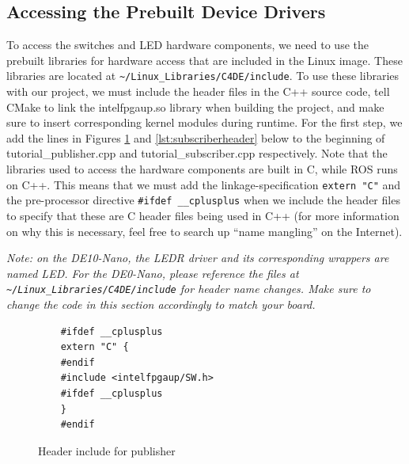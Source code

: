 \documentclass[11pt, twoside, pdftex]{article}
\begin{document}
\subsection{Accessing the Prebuilt Device Drivers}
To access the switches and LED hardware components, we need to use the prebuilt libraries for hardware access that are included in the Linux image. These libraries are located at \lstinline|~/Linux_Libraries/C4DE/include|. To use these libraries with our project, we must include the header files in the C++ source code, tell CMake to link the intelfpgaup.so library when building the project, and make sure to insert corresponding kernel modules during runtime. For the first step, we add the lines in Figures \ref{lst:publisherheader} and \ref{lst:subscriberheader} below to the beginning of tutorial\_publisher.cpp and tutorial\_subscriber.cpp respectively. Note that the libraries used to access the hardware components are built in C, while ROS runs on C++. This means that we must add the linkage-specification \lstinline|extern "C"| and the pre-processor directive \lstinline|#ifdef __cplusplus| when we include the header files to specify that these are C header files being used in C++ (for more information on why this is necessary, feel free to search up “name mangling” on the Internet). 

{\it Note: on the DE10-Nano, the LEDR driver and its corresponding wrappers are named LED. For the DE0-Nano, please reference the files at \lstinline|~/Linux_Libraries/C4DE/include| for header name changes. Make sure to change the code in this section accordingly to match your board.}

\begin{figure}[H]
\begin{lstlisting}
	#ifdef __cplusplus
	extern "C" {
	#endif
	#include <intelfpgaup/SW.h>
	#ifdef __cplusplus
	}
	#endif
\end{lstlisting}
\caption{Header include for publisher}
\label{lst:publisherheader}
\end{figure}
\end{document}
